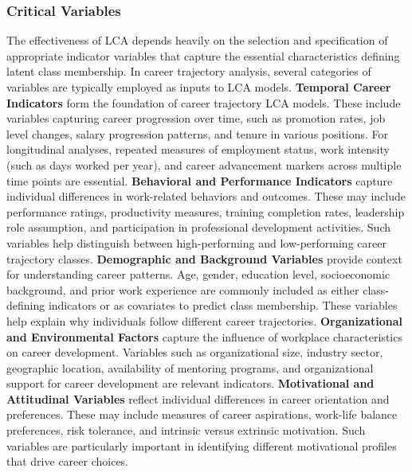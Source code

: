 \documentclass[main.tex]{subfiles}
\begin{document}
\subsubsection{Critical Variables}
The effectiveness of LCA depends heavily on the selection and specification of appropriate indicator variables that capture the essential characteristics defining latent class membership. In career trajectory analysis, several categories of variables are typically employed as inputs to LCA models.
\textbf{Temporal Career Indicators} form the foundation of career trajectory LCA models. These include variables capturing career progression over time, such as promotion rates, job level changes, salary progression patterns, and tenure in various positions\parencite{ramos2017}. For longitudinal analyses, repeated measures of employment status, work intensity (such as days worked per year), and career advancement markers across multiple time points are essential\parencite{ramos2017}.
\textbf{Behavioral and Performance Indicators} capture individual differences in work-related behaviors and outcomes. These may include performance ratings, productivity measures, training completion rates, leadership role assumption, and participation in professional development activities\parencite{sustainability2025}. Such variables help distinguish between high-performing and low-performing career trajectory classes.
\textbf{Demographic and Background Variables} provide context for understanding career patterns. Age, gender, education level, socioeconomic background, and prior work experience are commonly included as either class-defining indicators or as covariates to predict class membership\parencite{chen2021}. These variables help explain why individuals follow different career trajectories.
\textbf{Organizational and Environmental Factors} capture the influence of workplace characteristics on career development. Variables such as organizational size, industry sector, geographic location, availability of mentoring programs, and organizational support for career development are relevant indicators\parencite{sustainability2025}.
\textbf{Motivational and Attitudinal Variables} reflect individual differences in career orientation and preferences. These may include measures of career aspirations, work-life balance preferences, risk tolerance, and intrinsic versus extrinsic motivation\parencite{sustainability2025}. Such variables are particularly important in identifying different motivational profiles that drive career choices.
\end{document}
